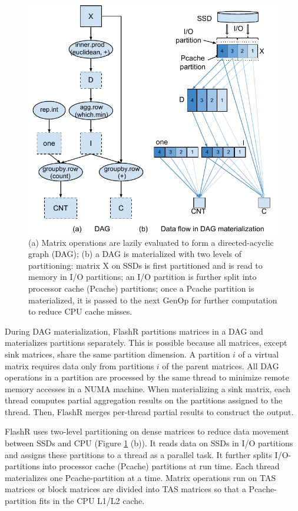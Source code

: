\begin{figure}
	\centering
	\includegraphics[scale=0.6]{FlashMatrix_figs/kmeans.pdf}
  \vspace{-4pt}
	\caption{(a) Matrix operations are lazily evaluated to form
	a directed-acyclic graph (DAG); (b) a DAG is materialized with
	two levels of partitioning: matrix X on SSDs is first partitioned
	and is read to memory in I/O partitions; an I/O partition is further
	split into processor cache (Pcache) partitions; once a Pcache partition
	is materialized, it is passed to the next GenOp for further computation
	to reduce CPU cache misses. }
	\label{fig:dag}
  \vspace{-8pt}
\end{figure}

During DAG materialization, FlashR partitions matrices in a DAG and
materializes partitions separately.
This is possible because all matrices, except
sink matrices, share the same partition dimension. 
A partition $i$ of a virtual matrix requires data only from partitions
$i$ of the parent matrices.  All DAG operations in a partition are processed by 
the same thread to minimize remote memory accesses in a NUMA machine.
When materializing a sink matrix, each thread computes partial
aggregation results on the partitions assigned to the thread. 
Then, FlashR merges per-thread partial results to construct the output.

FlashR uses two-level partitioning on dense matrices to reduce data movement
between SSDs and CPU (Figure \ref{fig:dag} (b)). It reads data on SSDs in
I/O partitions and assigns these partitions to a thread as a parallel task.
It further splits I/O-partitions into processor cache (Pcache)
partitions at run time.  Each thread materializes one Pcache-partition
at a time. Matrix operations run on TAS matrices or block matrices are
divided into TAS matrices so that a Pcache-partition fits in the CPU L1/L2 cache.

